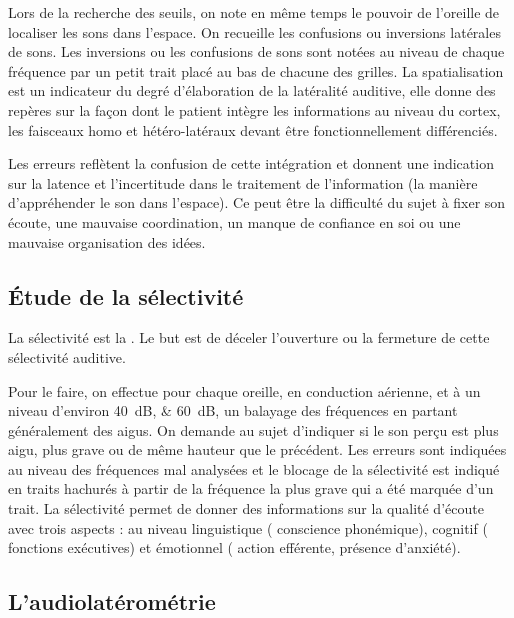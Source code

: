 Lors de la recherche des seuils, on note en même temps le pouvoir
de l'oreille de localiser les sons dans l'espace. On recueille les
confusions ou inversions latérales de sons. Les inversions ou les
confusions de sons sont notées au niveau de chaque fréquence par un
petit trait placé au bas de chacune des grilles. La spatialisation
est un indicateur du degré d'élaboration de la latéralité auditive,
elle donne des repères sur la façon dont le patient intègre les informations
au niveau du cortex, les faisceaux homo et hétéro-latéraux devant
être fonctionnellement différenciés. 

Les erreurs reflètent la confusion
de cette intégration et donnent une indication sur la latence et l'incertitude
dans le traitement de l'information (la manière d'appréhender le
son dans l'espace). Ce peut être la difficulté du sujet à fixer son
écoute, une mauvaise coordination, un manque de confiance en soi ou
une mauvaise organisation des idées.

\subsection{\'Etude de la sélectivité}

La sélectivité est la \autocite{tomatis:loreille}.
Le but est de déceler l'ouverture ou la fermeture de cette sélectivité
auditive. 

Pour le faire, on effectue pour chaque oreille, en conduction
aérienne, et à un niveau d'environ \SIlist{40;60}{\dB}, un balayage des
fréquences en partant généralement des aigus. On demande au sujet
d'indiquer si le son perçu est plus aigu, plus grave ou de même hauteur
que le précédent. Les erreurs sont indiquées au niveau des fréquences
mal analysées et le blocage de la sélectivité est indiqué en traits
hachurés à partir de la fréquence la plus grave qui a été marquée
d'un trait. La sélectivité permet de donner des informations sur la
qualité d'écoute avec trois aspects : au niveau linguistique ( conscience
phonémique), cognitif ( fonctions exécutives) et émotionnel ( action
efférente, présence d'anxiété).

\subsection{L'audiolatérométrie}

